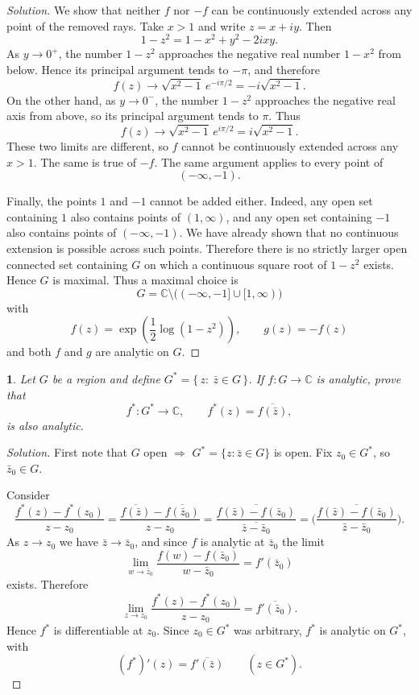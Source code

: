 \documentclass[12pt, a4paper]{report}
\theoremstyle{spaced}
\newtheorem{exercise}{}
\newcommand{\setexercise}[1]{\setcounter{exercise}{#1-1}}
\DeclareMathOperator{\Log}{log}
\begin{document}
\begin{proof}[Solution]
	We show that neither \(f\) nor \(-f\) can be continuously extended across any
	point of the removed rays.
	Take \(x>1\) and write \(z=x+iy\). Then
	\[
		1-z^2
		=
		1-x^2+y^2-2ixy.
	\]
	As \(y\to0^+\), the number \(1-z^2\) approaches the negative real number
	\(1-x^2\) from below. Hence its principal argument tends to \(-\pi\), and
	therefore
	\[
		f(z)
		\longrightarrow
		\sqrt{x^2-1}\,e^{-i\pi/2}
		=
		-i\sqrt{x^2-1}.
	\]
	On the other hand, as \(y\to0^-\), the number \(1-z^2\) approaches the
	negative real axis from above, so its principal argument tends to \(\pi\).
	Thus
	\[
		f(z)
		\longrightarrow
		\sqrt{x^2-1}\,e^{i\pi/2}
		=
		i\sqrt{x^2-1}.
	\]
	These two limits are different, so \(f\) cannot be continuously extended
	across any \(x>1\). The same is true of \(-f\).
	The same argument applies to every point of
	\[
		(-\infty,-1).
	\]

	Finally, the points \(1\) and \(-1\) cannot be added either. Indeed, any open
	set containing \(1\) also contains points of \((1,\infty)\), and any open set
	containing \(-1\) also contains points of \((-\infty,-1)\). We have already
	shown that no continuous extension is possible across such points.
	Therefore there is no strictly larger open connected set containing \(G\) on
	which a continuous square root of \(1-z^2\) exists. Hence \(G\) is maximal.
	Thus a maximal choice is
	\[
		G=\mathbb{C}\setminus\bigl((-\infty,-1]\cup[1,\infty)\bigr)
	\]
	with
	\[
		f(z)=\exp\!\left(\frac12\Log(1-z^2)\right),
		\qquad
		g(z)=-f(z)
	\]
	and both \(f\) and \(g\) are analytic on \(G\).
\end{proof}

\setexercise{19}
\begin{exercise}
	Let \(G\) be a region and define \(G^*=\{\,z:\ \bar z\in G\,\}\). If \(f:G\to\mathbb{C}\) is analytic, prove that
	\[
		f^*:G^*\to\mathbb{C},\qquad f^*(z)=\overline{f(\bar z)},
	\]
	is also analytic.
\end{exercise}

\begin{proof}[Solution]
	First note that $G$ open $\Rightarrow$ $G^*=\{z:\bar z\in G\}$ is open. Fix $z_0\in G^*$, so $\bar z_0\in G$.

	Consider
	\[
		\frac{f^*(z)-f^*(z_0)}{z-z_0}
		=\frac{\overline{f(\bar z)}-\overline{f(\bar z_0)}}{z-z_0}
		=\overline{\frac{f(\bar z)-f(\bar z_0)}{\overline{\bar z-\bar z_0}}}
		=\overline{\Big(\frac{f(\bar z)-f(\bar z_0)}{\bar z-\bar z_0}\Big)}.
	\]
	As $z\to z_0$ we have $\bar z\to \bar z_0$, and since $f$ is analytic at $\bar z_0$ the limit
	\[
		\lim_{w\to \bar z_0}\frac{f(w)-f(\bar z_0)}{w-\bar z_0}=f'(\bar z_0)
	\]
	exists. Therefore
	\[
		\lim_{z\to z_0}\frac{f^*(z)-f^*(z_0)}{z-z_0}
		=\overline{f'(\bar z_0)}.
	\]
	Hence $f^*$ is differentiable at $z_0$. Since $z_0\in G^*$ was arbitrary, $f^*$ is analytic on $G^*$, with
	\[
		(f^*)'(z)=\overline{f'(\bar z)}\qquad(z\in G^*).
	\]
\end{proof}
\end{document}
